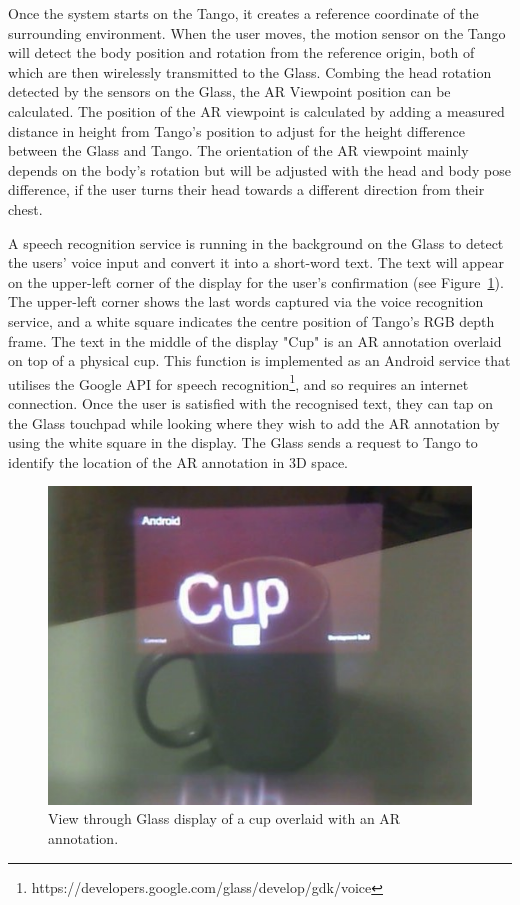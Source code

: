 Once the system starts on the Tango, it creates a reference coordinate of the surrounding environment. When the user moves, the motion sensor on the Tango will detect the body position and rotation from the reference origin, both of which are then wirelessly transmitted to the Glass. Combing the head rotation detected by the sensors on the Glass, the AR Viewpoint position can be calculated. The position of the AR viewpoint is calculated by adding a measured distance in height from Tango's position to adjust for the height difference between the Glass and Tango. The orientation of the AR viewpoint mainly depends on the body's rotation but will be adjusted with the head and body pose difference, if the user turns their head towards a different direction from their chest. 

A speech recognition service is running in the background on the Glass to detect the users' voice input and convert it into a short-word text. The text will appear on the upper-left corner of the display for the user's confirmation (see Figure~\ref{fig:mgia15:ui}). The upper-left corner shows the last words captured via the voice recognition service, and a white square indicates the centre position of Tango's RGB depth frame. The text in the middle of the display "Cup" is an AR annotation overlaid on top of a physical cup. This function is implemented as an Android service that utilises the Google API for speech recognition\footnote{https://developers.google.com/glass/develop/gdk/voice}, and so requires an internet connection. Once the user is satisfied with the recognised text, they can tap on the Glass touchpad while looking where they wish to add the AR annotation by using the white square in the display. The Glass sends a request to Tango to identify the location of the AR annotation in 3D space.

\begin{figure}
  \centering
  \includegraphics[width=0.6\linewidth]{images/62-3d-mgia15/WIN_20150614_204531_2.jpg}
  \caption{View through Glass display of a cup overlaid with an AR annotation.}
  \label{fig:mgia15:ui}
\end{figure}

